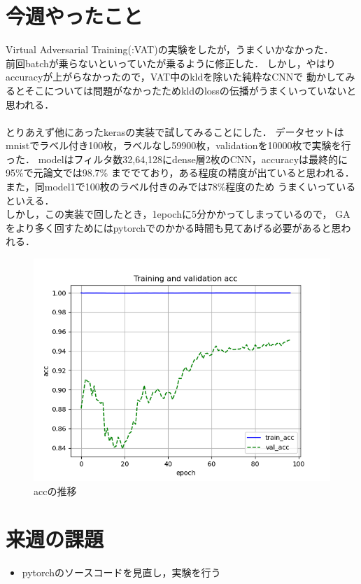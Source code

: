 \documentclass[twocolumn]{jarticle}     %
\begin{document}


\section{今週やったこと}

Virtual Adversarial Training(:VAT)の実験をしたが，うまくいかなかった．\\
前回batchが乗らないといっていたが乗るように修正した．
しかし，やはりaccuracyが上がらなかったので，VAT中のkldを除いた純粋なCNNで
動かしてみるとそこについては問題がなかったためkldのlossの伝播がうまくいっていないと思われる．\\
\\
とりあえず他にあったkerasの実装で試してみることにした．
データセットはmnistでラベル付き100枚，ラベルなし59900枚，validationを10000枚で実験を行った．
modelはフィルタ数32,64,128にdense層2枚のCNN，accuracyは最終的に95\%で元論文では98.7\%
まででており，ある程度の精度が出ていると思われる．また，同model1で100枚のラベル付きのみでは78\%程度のため
うまくいっているといえる．\\
しかし，この実装で回したとき，1epochに5分かかってしまっているので，
GAをより多く回すためにはpytorchでのかかる時間も見てあげる必要があると思われる．

\begin{figure}[hp]
	\centering
	\includegraphics[scale=0.7]{acc__.png}
	\caption{accの推移\label{fig:graph}}
\end{figure}


\section{来週の課題}
\begin{itemize}
	\item pytorchのソースコードを見直し，実験を行う
\end{itemize}
\end{document}
